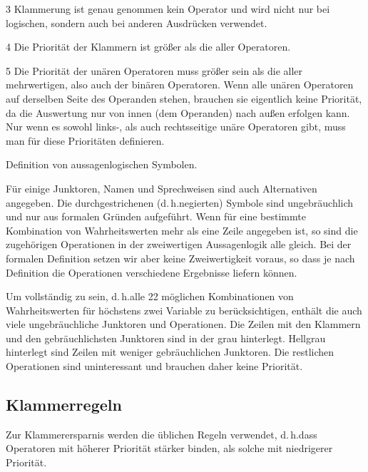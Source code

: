 \documentclass[english,ngerman,parskip=half,headsepline,footsepline,
	fleqn,notitlepage]{scrreprt}
\makeatletter
\newcommand*{\textdh}{d.\@\,h.\@ }
\makeatother
\begin{document}
\begin{table}
\begin{threeparttable}
\begin{tablenotes}
				\item[3] Klammerung ist genau genommen kein Operator und wird nicht nur bei logischen, sondern auch bei anderen Ausdrücken verwendet.

				\item[4] Die Priorität der Klammern ist größer als die aller Operatoren.

				\item[5] Die Priorität der unären Operatoren muss größer sein als die aller mehrwertigen, also auch der binären Operatoren.
				Wenn alle unären Operatoren auf derselben Seite des Operanden stehen, brauchen sie eigentlich keine Priorität, da die Auswertung nur von innen (dem Operanden) nach außen erfolgen kann.
				Nur wenn es sowohl links-, als auch rechtsseitige unäre Operatoren gibt, muss man für diese Prioritäten definieren.

			\end{tablenotes}
			\caption{Definition von aussagenlogischen Symbolen.}
			\label{tab:Symbole}%
		\end{threeparttable}
	\end{table}

	Für einige Junktoren, Namen und Sprechweisen sind auch Alternativen angegeben.
	Die durchgestrichenen (\textdh negierten) Symbole sind ungebräuchlich und nur aus formalen Gründen aufgeführt.
	Wenn für eine bestimmte Kombination von Wahrheitswerten mehr als eine Zeile angegeben ist, so sind die zugehörigen Operationen in der zweiwertigen Aussagenlogik alle gleich.
	Bei der formalen Definition setzen wir aber keine Zweiwertigkeit voraus, so dass je nach Definition die Operationen verschiedene Ergebnisse liefern können.

	Um vollständig zu sein, \textdh alle 22 möglichen Kombinationen von Wahrheitswerten für höchstens zwei Variable zu berücksichtigen, enthält die \tablename{} auch viele ungebräuchliche Junktoren und Operationen.
	Die Zeilen mit den Klammern und den gebräuchlichsten Junktoren sind in der \tablename{} grau hinterlegt.
	Hellgrau hinterlegt sind Zeilen mit weniger gebräuchlichen Junktoren.
	Die restlichen Operationen sind uninteressant und brauchen daher keine Priorität.

	\subsection{Klammerregeln}%
	\label{sub:Klammerregeln}

	Zur Klammerersparnis werden die üblichen Regeln verwendet, \textdh dass Operatoren mit höherer Priorität stärker binden, als solche mit niedrigerer Priorität.
\end{document}
